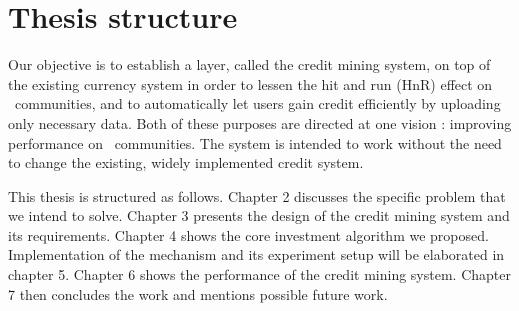 \section{Thesis structure}
Our objective is to establish a layer, called the credit mining system, on top of the existing currency system in order to lessen the hit and run (HnR) effect on \bt~communities, and to automatically let users gain credit efficiently by uploading only necessary data. Both of these purposes are directed at one vision : improving performance on \bt~communities. The system is intended to work without the need to change the existing, widely implemented credit system.

This thesis is structured as follows. Chapter 2 discusses the specific problem that we intend to solve. Chapter 3 presents the design of the credit mining system and its requirements. Chapter 4 shows the core investment algorithm we proposed. Implementation of the mechanism and its experiment setup will be elaborated in chapter 5. Chapter 6 shows the performance of the credit mining system. Chapter 7 then concludes the work and mentions possible future work.



